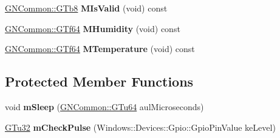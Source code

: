 \begin{DoxyCompactItemize}
\item 
\mbox{\label{class_g_n_common_1_1_g_n_drivers_1_1_g_tc_d_h_t_sensor_aa7f53cce05c35eb81133659caa23325b}} 
\mbox{\hyperlink{namespace_g_n_common_a6b5283329f609e2175dd0c91fc1520ba}{G\+N\+Common\+::\+G\+Tb8}} {\bfseries M\+Is\+Valid} (void) const
\item 
\mbox{\label{class_g_n_common_1_1_g_n_drivers_1_1_g_tc_d_h_t_sensor_afaba4e1a0d3e9a9d848c20a90256b2e5}} 
\mbox{\hyperlink{namespace_g_n_common_a22b37ff753b3e7a48d9d31addf35a739}{G\+N\+Common\+::\+G\+Tf64}} {\bfseries M\+Humidity} (void) const
\item 
\mbox{\label{class_g_n_common_1_1_g_n_drivers_1_1_g_tc_d_h_t_sensor_a122f70a816b339247e2ee8ea88e3fe89}} 
\mbox{\hyperlink{namespace_g_n_common_a22b37ff753b3e7a48d9d31addf35a739}{G\+N\+Common\+::\+G\+Tf64}} {\bfseries M\+Temperature} (void) const
\end{DoxyCompactItemize}
\subsection*{Protected Member Functions}
\begin{DoxyCompactItemize}
\item 
\mbox{\label{class_g_n_common_1_1_g_n_drivers_1_1_g_tc_d_h_t_sensor_a9fe2b4dde94b5d9c8ecd5a21cc73c928}} 
void {\bfseries m\+Sleep} (\mbox{\hyperlink{namespace_g_n_common_a01e8527dabf7ab4f123156b0701945eb}{G\+N\+Common\+::\+G\+Tu64}} aul\+Microseconds)
\item 
\mbox{\label{class_g_n_common_1_1_g_n_drivers_1_1_g_tc_d_h_t_sensor_a27065c9d674768053ef47549c2671993}} 
\mbox{\hyperlink{namespace_g_n_common_ae5485474bc8f23e462e920a17b377b53}{G\+Tu32}} {\bfseries m\+Check\+Pulse} (Windows\+::\+Devices\+::\+Gpio\+::\+Gpio\+Pin\+Value ke\+Level)
\end{DoxyCompactItemize}
